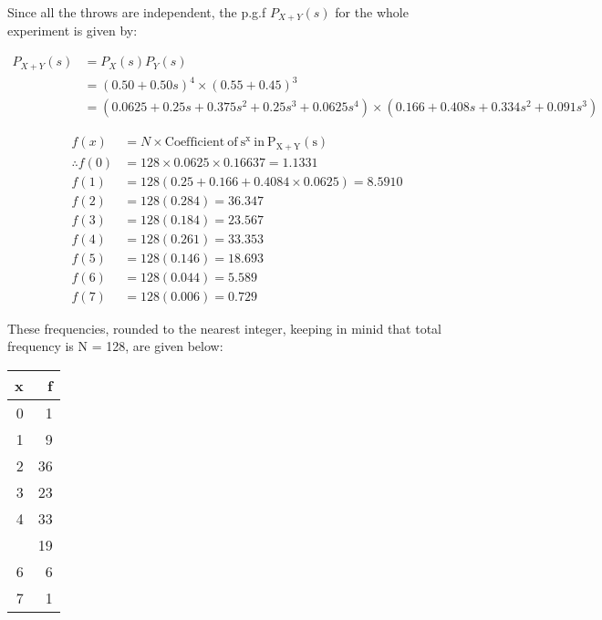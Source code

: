 \documentclass[ignorenonframetext,aspectratio=169]{beamer}
\begin{document}
\begin{frame}{}
\protect\hypertarget{section-33}{}

Since all the throws are independent, the p.g.f \(P_{X+Y}(s)\) for the
whole experiment is given by:

\[
\begin{aligned}
P_{X+Y}(s) &= P_{X}(s)P_{Y}(s) \\
& = (0.50 + 0.50 s)^4 \times (0.55 + 0.45)^3 \\
& = (0.0625 + 0.25 s + 0.375 s^2 + 0.25 s^3 + 0.0625 s^4) \times (0.166 + 0.408 s + 0.334 s^2 + 0.091 s^3)
\end{aligned}
\]

\end{frame}

\begin{frame}{}
\protect\hypertarget{section-34}{}

\[
\begin{aligned}
f(x) &= N \times \mathrm{ Coefficient~of~s^x~in~P_{X+Y}(s)} \\
\therefore  f(0) &= 128 \times 0.0625 \times 0.16637 = 1.1331 \\
f(1) &= 128 (0.25 + 0.166 + 0.4084 \times 0.0625) = 8.5910 \\
f(2) &= 128(0.284) = 36.347 \\
f(3) &= 128(0.184) = 23.567 \\
f(4) &= 128(0.261) = 33.353 \\
f(5) &= 128(0.146) = 18.693 \\
f(6) &= 128(0.044) = 5.589 \\
f(7) &= 128(0.006) = 0.729 
\end{aligned}
\]

\end{frame}

\begin{frame}{}
\protect\hypertarget{section-35}{}

These frequencies, rounded to the nearest integer, keeping in minid that
total frequency is N = 128, are given below:

\begin{table}[H]
\centering
\begin{tabular}{rr}
\toprule
x & f\\
\midrule
0 & 1\\
1 & 9\\
2 & 36\\
3 & 23\\
4 & 33\\
\addlinespace
5 & 19\\
6 & 6\\
7 & 1\\
\bottomrule
\end{tabular}
\end{table}

\end{frame}
\end{document}

